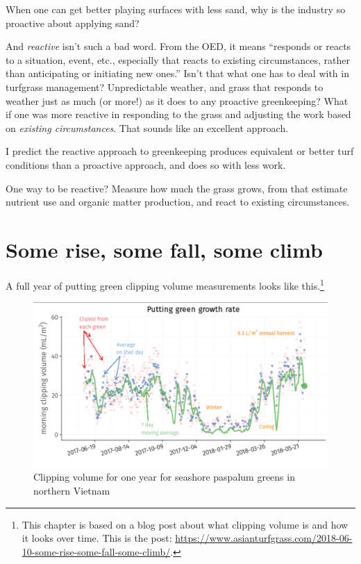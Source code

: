 \documentclass[12pt,b5,]{tufte-book}
\begin{document}
When one can get better playing surfaces with less sand, why is the industry so proactive about applying sand?

And \emph{reactive} isn't such a bad word. From the OED, it means ``responds or reacts to a situation, event, etc., especially that reacts to existing circumstances, rather than anticipating or initiating new ones.'' Isn't that what one has to deal with in turfgrass management? Unpredictable weather, and grass that responds to weather just as much (or more!) as it does to any proactive greenkeeping? What if one was more reactive in responding to the grass and adjusting the work based on \emph{existing circumstances}. That sounds like an excellent approach.

I predict the reactive approach to greenkeeping produces equivalent or better turf conditions than a proactive approach, and does so with less work.

One way to be reactive? Measure how much the grass grows, from that estimate nutrient use and organic matter production, and react to existing circumstances.

\hypertarget{some-rise-some-fall-some-climb}{%
\chapter{Some rise, some fall, some climb}\label{some-rise-some-fall-some-climb}}

A full year of putting green clipping volume measurements looks like this.\footnote{This chapter is based on a blog post about what clipping volume is and how it looks over time. This is the post: \url{https://www.asianturfgrass.com/2018-06-10-some-rise-some-fall-some-climb/}.}

\begin{figure}
\centering
\includegraphics{img/b11-1.png}
\caption{Clipping volume for one year for seashore paspalum greens in northern Vietnam}
\end{figure}
\end{document}
